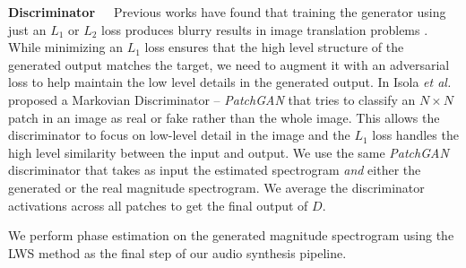 \documentclass[a4paper]{article}
\begin{document}
\textbf{Discriminator}~~~Previous works have
found
that training the generator using just an $L_1$ or $L_2$ loss produces blurry results in image translation problems \cite{pathakCVPR16context,zhang2016colorful}. While minimizing an $L_1$ loss ensures that the high level structure of the generated output matches the target, we need to augment it with an adversarial loss to help maintain the low level details in the generated output.
In \cite{pix2pix} Isola \emph{et al.} proposed a Markovian Discriminator -- \textit{PatchGAN}  that tries to classify an $N \times N$  patch in an image as real or fake rather than the whole image. This allows the discriminator to focus on low-level detail in the image and the $L_1$ loss handles the high level similarity between the input and output. 
We use the same \textit{PatchGAN} discriminator that takes as input the estimated spectrogram \emph{and} either the generated or the real magnitude spectrogram.
We average the discriminator activations across all patches to get the final output of $D$.

We perform phase estimation on the generated magnitude spectrogram using the LWS method as the final step of our audio synthesis pipeline.



\end{document}
